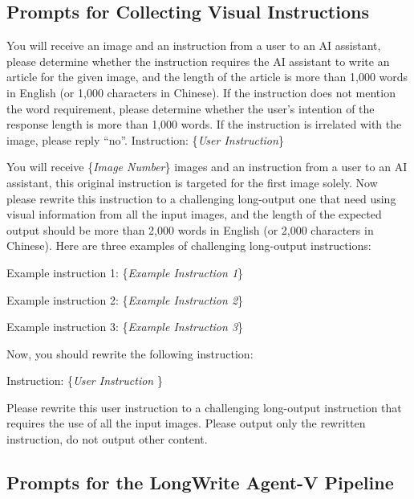 \subsection{Prompts for Collecting Visual Instructions}
\begin{tcolorbox}[size=title,opacityfill=0.1,breakable]
\noindent
You will receive an image and an instruction from a user to an AI assistant, please determine whether the instruction requires the AI assistant to write an article for the given image, and the length of the article is more than 1,000 words in English (or 1,000 characters in Chinese). If the instruction does not mention the word requirement, please determine whether the user’s intention of the response length is more than 1,000 words. If the instruction is irrelated with the image, please reply “no”.
Instruction: \{\textit{User Instruction}\}
\end{tcolorbox}



\begin{tcolorbox}[size=title,opacityfill=0.1,breakable]
\noindent
You will receive {\{\textit{Image Number}\}} images and an instruction from a user to an AI assistant, this original instruction is targeted for the first image solely. Now please rewrite this instruction to a challenging long-output one that need using visual information from all the input images, and the length of the expected output should be more than 2,000 words in English (or 2,000 characters in Chinese). Here are three examples of challenging long-output instructions:

Example instruction 1: \{\textit{Example Instruction 1}\}

Example instruction 2: \{\textit{Example Instruction 2}\}

Example instruction 3: \{\textit{Example Instruction 3}\}

Now, you should rewrite the following instruction:

Instruction: \{\textit{User Instruction }\}

Please rewrite this user instruction to a challenging long-output instruction that requires the use of all the input images. Please output only the rewritten instruction, do not output other content.
\end{tcolorbox}

\subsection{Prompts for the LongWrite Agent-V Pipeline}
\label{app:prompt_lav}

